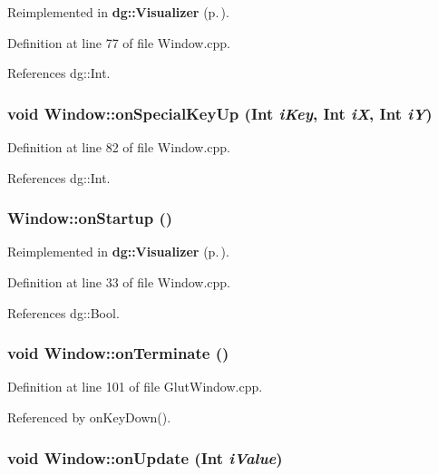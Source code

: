 Reimplemented in {\bf dg::Visualizer} {\rm (p.\,\pageref{classdg_1_1Visualizer_a8})}.

Definition at line 77 of file Window.cpp.

References dg::Int.
\subsubsection{\setlength{\rightskip}{0pt plus 5cm}void Window::on\-Special\-Key\-Up ({\bf Int} {\em i\-Key}, {\bf Int} {\em i\-X}, {\bf Int} {\em i\-Y})\hspace{0.3cm}{\tt  [virtual]}}\label{classdg_1_1Window_a13}




Definition at line 82 of file Window.cpp.

References dg::Int.
\subsubsection{ Window::on\-Startup ()\hspace{0.3cm}{\tt  [virtual]}}\label{classdg_1_1Window_a1}




Reimplemented in {\bf dg::Visualizer} {\rm (p.\,\pageref{classdg_1_1Visualizer_a2})}.

Definition at line 33 of file Window.cpp.

References dg::Bool.
\subsubsection{\setlength{\rightskip}{0pt plus 5cm}void Window::on\-Terminate ()\hspace{0.3cm}{\tt  [virtual]}}\label{classdg_1_1Window_a3}




Definition at line 101 of file Glut\-Window.cpp.

Referenced by on\-Key\-Down().
\subsubsection{\setlength{\rightskip}{0pt plus 5cm}void Window::on\-Update ({\bf Int} {\em i\-Value})\hspace{0.3cm}{\tt  [virtual]}}\label{classdg_1_1Window_a6}




